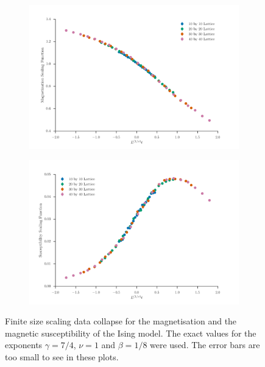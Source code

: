 \documentclass[11pt, a4paper]{report} %
\begin{document}
\begin{figure}[htb]
	\centering
	\begin{subfigure}{\linewidth}
		\includegraphics[width=\linewidth]{ising_magnetization_exact_data_collapse.pdf}
	\end{subfigure}

	\begin{subfigure}{\linewidth}
		\includegraphics[width=\linewidth]{ising_susceptibility_exact_data_collapse.pdf}
	\end{subfigure}
	\caption{Finite size scaling data collapse for the magnetisation and the magnetic susceptibility of the Ising model. The exact values for the exponents \(\gamma = 7/4\), \(\nu=1\) and \(\beta=1/8\) were used. The error bars are too small to see in these plots.}
	\label{fig:ising_data_collapse}
\end{figure}
\end{document}

